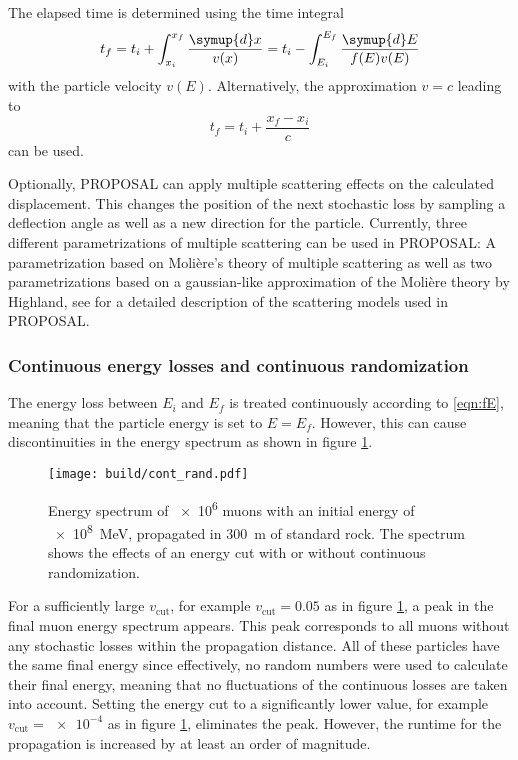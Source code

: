 The elapsed time is determined using the time integral 
%
\begin{equation}
	t_f = t_i + \int_{x_i}^{x_f} \frac{\symup{d}x}{v(x)} = t_i - \int_{E_i}^{E_f} \frac{\symup{d}E}{f(E)v(E)}
\end{equation}
%
with the particle velocity $v(E)$.
Alternatively, the approximation $v=c$ leading to 
%
\begin{equation}
	t_f = t_i + \frac{x_f - x_i}{c}
\end{equation}
%
can be used.

Optionally, PROPOSAL can apply multiple scattering effects on the calculated displacement.
This changes the position of the next stochastic loss by sampling a deflection angle as well as a new direction for the particle.
Currently, three different parametrizations of multiple scattering can be used in PROPOSAL:
A parametrization based on Molière's theory of multiple scattering as well as two parametrizations based on a gaussian-like approximation of the Molière theory by Highland, see \cite{GeiselBrinck2013RevisionOT} for a detailed description of the scattering models used in PROPOSAL. 

\subsubsection{Continuous energy losses and continuous randomization}

The energy loss between $E_i$ and $E_f$ is treated continuously according to \eqref{eqn:fE}, meaning that the particle energy is set to $E = E_f$.
However, this can cause discontinuities in the energy spectrum as shown in figure \ref{fig:cont_rand}.

\begin{figure}
    \centering
    \texttt{[image: build/cont\_rand.pdf]}
    \caption[Energy spectrum of \num{e6} muons with an initial energy of \SI{e8}{\mega\electronvolt}, propagated in \SI{300}{\meter} of standard rock. The spectrum shows the effects of an energy cut with or without continuous randomization.]{Energy spectrum of \num{e6} muons with an initial energy of \SI{e8}{\mega\electronvolt}, propagated in \SI{300}{\meter} of standard rock\protect\footnotemark. The spectrum shows the effects of an energy cut with or without continuous randomization.}
    \label{fig:cont_rand}
\end{figure}

For a sufficiently large $v_\text{cut}$, for example $v_\text{cut} = 0.05$ as in figure \ref{fig:cont_rand}, a peak in the final muon energy spectrum appears.
This peak corresponds to all muons without any stochastic losses within the propagation distance.
All of these particles have the same final energy since effectively, no random numbers were used to calculate their final energy, meaning that no fluctuations of the continuous losses are taken into account.
Setting the energy cut to a significantly lower value, for example $v_\text{cut} = \num{e-4}$ as in figure \ref{fig:cont_rand}, eliminates the peak. 
However, the runtime for the propagation is increased by at least an order of magnitude.

